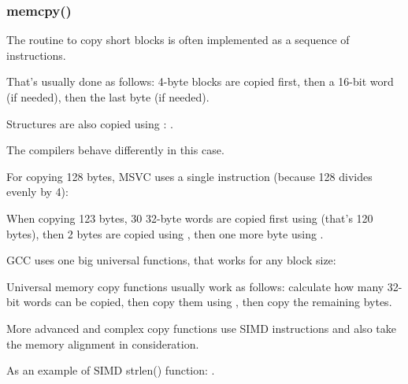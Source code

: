 \subsubsection{memcpy()}

\label{copying_short_blocks}


The routine to copy short blocks is often implemented as a sequence of \MOV instructions.








That's usually done as follows: 4-byte blocks are copied first, then a 16-bit word (if needed), 
then the last byte (if needed).

Structures are also copied using
\MOV: .


The compilers behave differently in this case.




For copying 128 bytes, MSVC uses a single  instruction (because 128 
divides evenly by 4):




When copying 123 bytes, 30 32-byte words are copied first using 
(that's 120 bytes),
then 2 bytes are copied using , 
then one more byte using .




GCC uses one big universal functions, that works for any block size:




Universal memory copy functions usually work as follows:
calculate how many 32-bit words can be copied, then copy them using , then copy
the remaining bytes.


More advanced and complex copy functions use \ac{SIMD} instructions and also take the memory alignment
in consideration.

As an example of SIMD strlen() function: .

